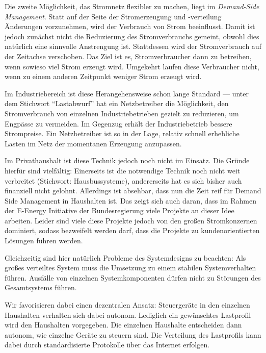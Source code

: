 \documentclass[12pt,BCOR=8.5mm]{scrartcl}
\begin{document}
Die zweite Möglichkeit, das Stromnetz flexibler zu machen, liegt im \emph{Demand-Side
Management}. Statt auf der Seite der Stromerzeugung und -verteilung
Änderungen vorzunehmen, wird der Verbrauch von Strom beeinflusst. Damit
ist jedoch zunächst nicht die Reduzierung des Stromverbrauchs gemeint,
obwohl dies natürlich eine sinnvolle Anstrengung ist. Stattdessen wird
der Stromverbrauch auf der Zeitachse verschoben. Das Ziel ist es,
Stromverbraucher dann zu betreiben, wenn sowieso viel Strom erzeugt
wird. Umgekehrt laufen diese Verbraucher nicht, wenn zu einem anderen
Zeitpunkt weniger Strom erzeugt wird.




Im Industriebereich ist diese Herangehensweise schon lange Standard ---
unter dem Stichwort "`Lastabwurf"' hat ein Netzbetreiber die
Möglichkeit, den Stromverbrauch von einzelnen Industriebetrieben gezielt
zu reduzieren, um Engpässe zu vermeiden. Im Gegenzug erhält der
Industriebetrieb bessere Strompreise. Ein Netzbetreiber ist so in der
Lage, relativ schnell erhebliche Lasten im Netz der momentanen Erzeugung
anzupassen.

Im Privathaushalt ist diese Technik jedoch noch nicht im Einsatz. Die
Gründe hierfür sind vielfältig: Einerseits ist die notwendige Technik
noch nicht weit verbreitet (Stichwort: Hausbussysteme), andererseits hat
es sich bisher auch finanziell nicht gelohnt. Allerdings ist absehbar,
dass nun die Zeit reif für Demand Side Management in Haushalten ist. Das
zeigt sich auch daran, dass im Rahmen der E-Energy Initiative der
Bundesregierung viele Projekte an dieser Idee arbeiten. Leider sind viele diese Projekte jedoch von den großen
Stromkonzernen dominiert, sodass bezweifelt werden darf, dass die
Projekte zu kundenorientierten Lösungen führen werden. 


Gleichzeitig sind hier natürlich Probleme des Systemdesigns zu beachten:
Als großes verteiltes System muss die Umsetzung zu einem stabilen
Systemverhalten führen. Ausfälle von einzelnen Systemkomponenten dürfen
nicht zu Störungen des Gesamtsystems führen.

Wir favorisieren dabei einen dezentralen Ansatz: Steuergeräte in den
einzelnen Haushalten verhalten sich dabei autonom. Lediglich ein
gewünschtes Lastprofil wird den Haushalten vorgegeben. Die einzelnen
Haushalte entscheiden dann autonom, wie einzelne Geräte zu steuern sind.
Die Verteilung des Lastprofils kann dabei durch standardisierte
Protokolle über das Internet erfolgen.
\end{document}

